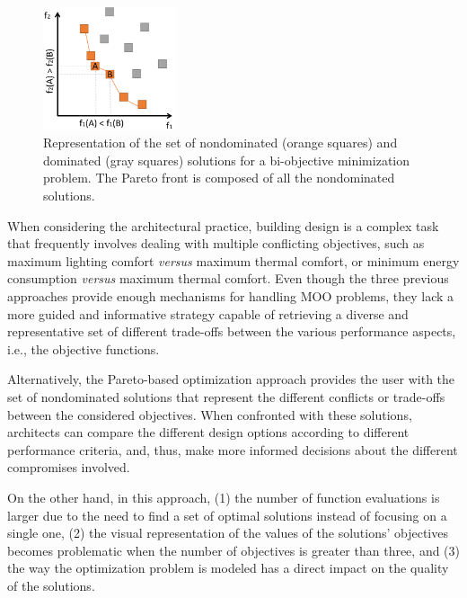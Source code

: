 	\begin{figure}
		\centering
		\includegraphics[width=0.35\textwidth]{Images/Background/pareto-front.PNG}
		\caption[Representation of a Pareto front example for a bi-objective optimization problem]{Representation of the set of nondominated (orange squares) and dominated (gray squares) solutions for a bi-objective minimization problem. The Pareto front is composed of all the nondominated solutions.}
		\label{fig:paretofrontier}
	\end{figure}
	
	When considering the architectural practice, building design is a complex task that frequently involves dealing with multiple conflicting objectives, such as maximum lighting comfort \textit{versus} maximum thermal comfort, or minimum energy consumption \textit{versus} maximum thermal comfort. Even though the three previous approaches provide enough mechanisms for handling \ac{MOO} problems, they lack a more guided and informative strategy capable of retrieving a diverse and representative set of different trade-offs between the various performance aspects, i.e., the objective functions.
	
	Alternatively, the Pareto-based optimization approach provides the user with the set of nondominated solutions that represent the different conflicts or trade-offs between the considered objectives. When confronted with these solutions, architects can compare the different design options according to different performance criteria, and, thus, make more informed decisions about the different compromises involved. 
	
	On the other hand, in this approach, (1) the number of function evaluations is larger due to the need to find a set of optimal solutions instead of focusing on a single one, (2) the visual representation of the values of the solutions' objectives becomes problematic when the number of objectives is greater than three, and (3) the way the optimization problem is modeled has a direct impact on the quality of the solutions.
	
